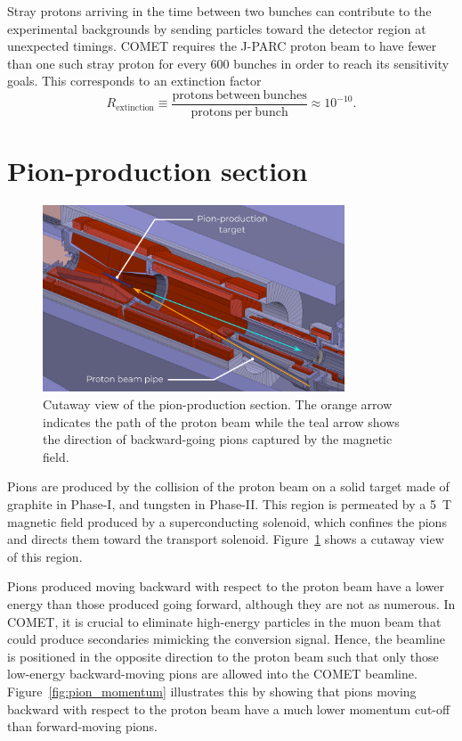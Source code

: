 
Stray protons arriving in the time between two bunches can contribute to the
experimental backgrounds by sending particles toward the detector region at
unexpected timings. COMET requires the J-PARC proton beam to have fewer than one
such stray proton for every 600 bunches in order to reach its sensitivity goals.
This corresponds to an extinction factor
\begin{equation}\label{eq:extinction}
R_\mathrm{extinction} \equiv \frac{\mathrm{protons\ between\
bunches}}{\mathrm{protons\ per\ bunch}} \approx 10^{-10}.
\end{equation}

\section{Pion-production section}

\begin{figure}
    \centering
    \includegraphics[width=0.8\textwidth]{chapter2/pion_production_section.png.pdf}
    \caption{ Cutaway view of the pion-production section. The orange arrow
        indicates the path of the proton beam while the teal arrow shows the
        direction of backward-going pions captured by the magnetic field.}
    \label{fig:pion_production_section}
\end{figure}

Pions are produced by the collision of the proton beam on a solid target made of
graphite in Phase-I, and tungsten in Phase-II. This region is permeated by a
\SI{5}{\tesla} magnetic field produced by a superconducting solenoid, which
confines the pions and directs them toward the transport solenoid.
Figure~\ref{fig:pion_production_section} shows a cutaway view of this
region.


Pions produced moving backward with respect to the proton beam have a lower
energy than those produced going forward, although they are not as numerous. In
COMET, it is crucial to eliminate high-energy particles in the muon beam that
could produce secondaries mimicking the conversion signal. Hence, the beamline
is positioned in the opposite direction to the proton beam such that only those
low-energy backward-moving pions are allowed into the COMET beamline.
Figure~\ref{fig:pion_momentum} illustrates this by showing that pions moving
backward with respect to the proton beam have a much lower momentum cut-off than
forward-moving pions.

